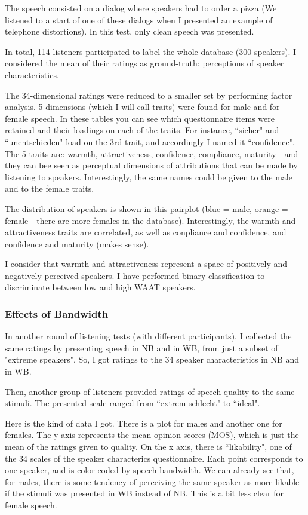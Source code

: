 \documentclass[a4paper]{article}
\begin{document}
The speech consisted on a dialog where speakers had to order a pizza (We listened to a start of one of these dialogs when I presented an example of telephone distortions). In this test, only clean speech was presented.

In total, 114 listeners participated to label the whole database (300 speakers). I considered the mean of their ratings as ground-truth: perceptions of speaker characteristics.

The 34-dimensional ratings were reduced to a smaller set by performing factor analysis. 5 dimensions (which I will call traits) were found for male and for female speech. In these tables you can see which questionnaire items were retained and their loadings on each of the traits. For instance, ``sicher" and ``unentschieden" load on the 3rd trait, and accordingly I named it ``confidence". The 5 traits are: warmth, attractiveness, confidence, compliance, maturity - and they can bee seen as perceptual dimensions of attributions that can be made by listening to speakers. Interestingly, the same names could be given to the male and to the female traits.

The distribution of speakers is shown in this pairplot (blue = male, orange = female - there are more females in the database). Interestingly, the warmth and attractiveness traits are correlated, as well as conpliance and confidence, and confidence and maturity (makes sense).

I consider that warmth and attractiveness represent a space of positively and negatively perceived speakers. I have performed binary classification to discriminate between low and high WAAT speakers.


\subsubsection{Effects of Bandwidth}

In another round of listening tests (with different participants), I collected the same ratings by presenting speech in NB and in WB, from just a subset of "extreme speakers". So, I got ratings to the 34 speaker characteristics in NB and in WB.

Then, another group of listeners provided ratings of speech quality to the same stimuli. The presented scale ranged from ``extrem schlecht" to ``ideal".

Here is the kind of data I got. There is a plot for males and another one for females. The y axis represents the mean opinion scores (MOS), which is just the mean of the ratings given to quality. On the x axis, there is ``likability", one of the 34 scales of the speaker characterics questionnaire. Each point corresponds to one speaker, and is color-coded by speech bandwidth. We can already see that, for males, there is some tendency of perceiving the same speaker as more likable if the stimuli was presented in WB instead of NB. This is a bit less clear for female speech.
\end{document}
